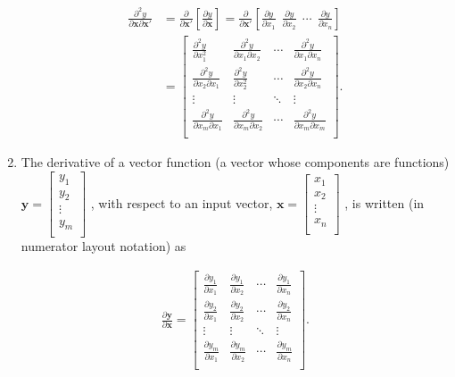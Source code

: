 \documentclass[10pt]{beamer}
\begin{document}
\begin{frame}[allowframebreaks]
\begin{enumerate}
  \begin{align*}
    \frac{\partial^2 y}{\partial \mathbf{x}\partial \mathbf{x}'}&=\frac{\partial
    }{\partial \mathbf{x}'}\left[\frac{\partial y}{\partial \mathbf{x}}\right]=\frac{\partial}{\partial \mathbf{x}'}\left[ \frac{\partial y}{\partial x_1} \ \ \frac{\partial y}{\partial x_2} \ \ \cdots \ \ \frac{\partial y}{\partial x_n} \right] \\&= \begin{bmatrix} \frac{\partial^2 y}{\partial x_1^2} & \frac{\partial^2 y}{\partial x_1\partial x_2} & \cdots & \frac{\partial^2 y}{\partial x_1\partial x_n}\\ \frac{\partial^2 y}{\partial x_2\partial x_1} & \frac{\partial^2 y}{\partial x_2^2} & \cdots & \frac{\partial^2 y}{\partial x_2\partial x_n}\\ \vdots & \vdots & \ddots & \vdots\\ \frac{\partial^2 y}{\partial x_m\partial x_1} & \frac{\partial^2 y}{\partial x_m\partial x_2} & \cdots & \frac{\partial^2 y}{\partial x_m\partial x_m}\\ \end{bmatrix}.
  \end{align*}

\item The derivative of a vector function (a vector whose components are functions) $\mathbf{y} = \begin{bmatrix} y_1 \\ y_2 \\ \vdots \\ y_m \\ \end{bmatrix}$ , with respect to an input vector, $\mathbf{x} = \begin{bmatrix} x_1 \\ x_2 \\ \vdots \\ x_n \\ \end{bmatrix}$ , is written (in numerator layout notation) as

  \begin{align*}
    \frac{\partial \mathbf{y}}{\partial \mathbf{x}} = \begin{bmatrix} \frac{\partial y_1}{\partial x_1} & \frac{\partial y_1}{\partial x_2} & \cdots & \frac{\partial y_1}{\partial x_n}\\ \frac{\partial y_2}{\partial x_1} & \frac{\partial y_2}{\partial x_2} & \cdots & \frac{\partial y_2}{\partial x_n}\\ \vdots & \vdots & \ddots & \vdots\\ \frac{\partial y_m}{\partial x_1} & \frac{\partial y_m}{\partial x_2} & \cdots & \frac{\partial y_m}{\partial x_n}\\ \end{bmatrix}.
  \end{align*}


\end{enumerate}
\end{frame}
\end{document}
